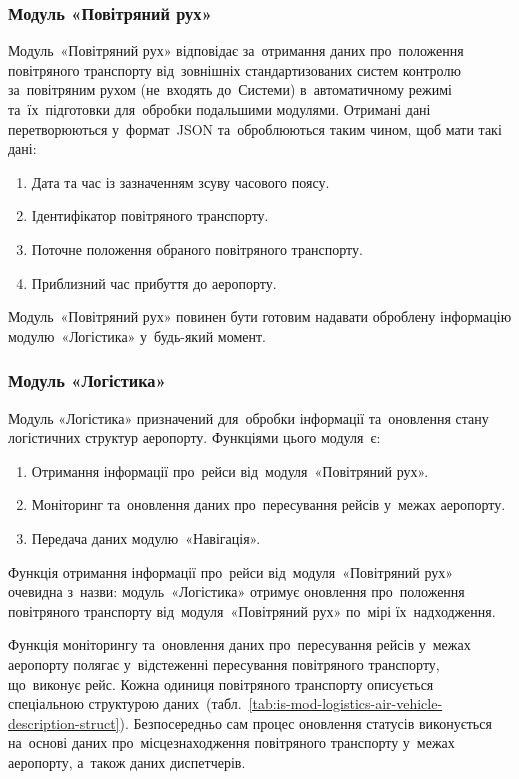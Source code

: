 \documentclass[
	a4paper,
	oneside,
	BCOR = 10mm,
	DIV = 12,
	12pt,
	headings = normal,
]{scrartcl}
\newcommand{\allcaps}[1]{{\addfontfeatures{LetterSpace = 8, Kerning = Off}#1}}
\begin{document}
			\subsubsection{Модуль «Повітряний рух»}
				Модуль~«Повітряний рух» відповідає за~отримання даних про~положення повітряного транспорту від~зовнішніх стандартизованих систем контролю за~повітряним рухом (не~входять до~Системи) в~автоматичному режимі та~їх~підготовки для~обробки подальшими модулями. Отримані дані перетворюються у~формат~\allcaps{JSON} та~оброблюються таким чином, щоб мати такі дані:
				\begin{enumerate}[noitemsep]
					\item Дата та час із зазначенням зсуву часового поясу.
					\item Ідентифікатор повітряного транспорту.
					\item Поточне положення обраного повітряного транспорту.
					\item Приблизний час прибуття до аеропорту.
				\end{enumerate}
				
				Модуль~«Повітряний рух» повинен бути готовим надавати оброблену інформацію модулю~«Логістика» у~будь-який момент.

			\subsubsection{Модуль «Логістика»}
				Модуль «Логістика» призначений для~обробки інформації та~оновлення стану логістичних структур аеропорту. Функціями цього модуля~є:
				\begin{enumerate}[noitemsep]
					\item Отримання інформації про~рейси від~модуля~«Повітряний рух».
					\item Моніторинг та~оновлення даних про~пересування рейсів у~межах аеропорту.
					\item Передача даних модулю~«Навігація».
				\end{enumerate}

				Функція отримання інформації про~рейси від~модуля~«Повітряний рух» очевидна з~назви: модуль~«Логістика» отримує оновлення про~положення повітряного транспорту від~модуля~«Повітряний рух» по~мірі їх~надходження.

				Функція моніторингу та~оновлення даних про~пересування рейсів у~межах аеропорту полягає у~відстеженні пересування повітряного транспорту, що~виконує рейс. Кожна одиниця повітряного транспорту описується спеціальною структурою даних~(табл.~\ref{tab:is-mod-logistics-air-vehicle-description-struct}). Безпосередньо сам процес оновлення статусів виконується на~основі даних про~місцезнаходження повітряного транспорту у~межах аеропорту, а~також даних диспетчерів.
\end{document}
